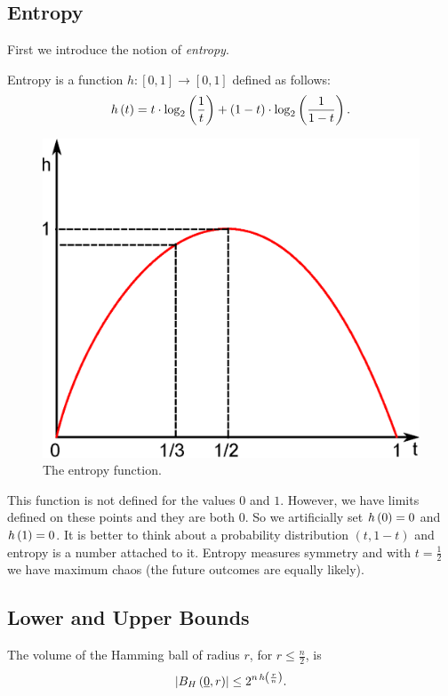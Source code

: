 \subsection{Entropy}
First we introduce the notion of \emph{entropy}.

\begin{definition}[Entropy]
Entropy is a function $h: [0, 1] \to [0, 1]$ defined as follows:
\begin{equation}
	h\left({t}\right) =
	t \cdot \log_2 \left( \frac{1}{t} \right)
	+
	(1 - t) \cdot \log_2 \left( \frac{1}{1-t} \right).
\end{equation} 
\end{definition}

\begin{figure}[h!]
	\centering
	\includegraphics[width=0.5\linewidth]{pictures/ch01-i00.eps}
	\caption{The entropy function.}
\end{figure}

This function is not defined for the values $0$ and $1$.
However, we have limits defined on these points and they are both $0$.
So we artificially set $h\left({0}\right) = 0$ and $h\left({1}\right) = 0$.
It is better to think about a probability distribution $(t, 1 - t)$ and entropy is a number attached to it.
Entropy measures symmetry and with $t = \frac{1}{2}$ we have maximum chaos (the future outcomes are equally likely).

\subsection{Lower and Upper Bounds}

\begin{thm}
	The volume of the Hamming ball of radius $r$, for $r \leq \frac{n}{2}$, is
	\begin{equation*}
		\left|{B_H\left(\underline{0}, r\right)}\right| \leq 2^{n \, h\left({\frac{r}{n}}\right)}.
	\end{equation*}
\end{thm}

